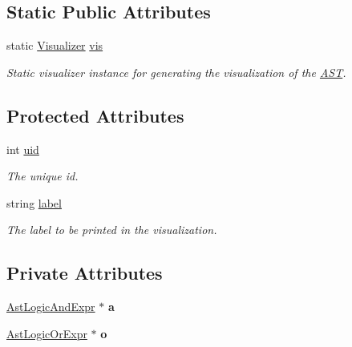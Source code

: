 \subsection*{Static Public Attributes}
\begin{DoxyCompactItemize}
\item 
\hypertarget{classAST_aca9e6637209b31e03a09c0d42f29bdfa}{static \hyperlink{classVisualizer}{Visualizer} \hyperlink{classAST_aca9e6637209b31e03a09c0d42f29bdfa}{vis}}\label{classAST_aca9e6637209b31e03a09c0d42f29bdfa}

\begin{DoxyCompactList}\small\item\em Static visualizer instance for generating the visualization of the \hyperlink{classAST}{A\-S\-T}. \end{DoxyCompactList}\end{DoxyCompactItemize}
\subsection*{Protected Attributes}
\begin{DoxyCompactItemize}
\item 
\hypertarget{classAST_a847b778f1c3dd5a19de32de432ee6e15}{int \hyperlink{classAST_a847b778f1c3dd5a19de32de432ee6e15}{uid}}\label{classAST_a847b778f1c3dd5a19de32de432ee6e15}

\begin{DoxyCompactList}\small\item\em The unique id. \end{DoxyCompactList}\item 
\hypertarget{classAST_ab2e239ccc0688d2341724432ff5a1a31}{string \hyperlink{classAST_ab2e239ccc0688d2341724432ff5a1a31}{label}}\label{classAST_ab2e239ccc0688d2341724432ff5a1a31}

\begin{DoxyCompactList}\small\item\em The label to be printed in the visualization. \end{DoxyCompactList}\end{DoxyCompactItemize}
\subsection*{Private Attributes}
\begin{DoxyCompactItemize}
\item 
\hypertarget{classAstLogicOrExpr_a6bfd44db6e0882a6f6cdac1fa98ac2f5}{\hyperlink{classAstLogicAndExpr}{Ast\-Logic\-And\-Expr} $\ast$ {\bfseries a}}\label{classAstLogicOrExpr_a6bfd44db6e0882a6f6cdac1fa98ac2f5}

\item 
\hypertarget{classAstLogicOrExpr_ab5e057f3c286180fc689ad145b9bc2f3}{\hyperlink{classAstLogicOrExpr}{Ast\-Logic\-Or\-Expr} $\ast$ {\bfseries o}}\label{classAstLogicOrExpr_ab5e057f3c286180fc689ad145b9bc2f3}

\end{DoxyCompactItemize}


